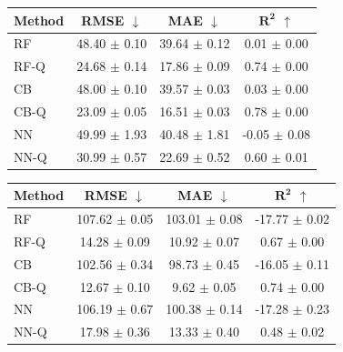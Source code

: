 \begin{table}[t]
    \vspace{1em}

    \begin{minipage}{0.48\textwidth}
        \centering
        \label{tab:ood-rtx5000}
        \begin{tabular}{lccc}
            \toprule
            \textbf{Method} & \textbf{RMSE} $\downarrow$ & \textbf{MAE} $\downarrow$ & $\boldsymbol{R^2}$ $\uparrow$ \\
            \midrule
            RF      & 48.40 $\pm$ 0.10 & 39.64 $\pm$ 0.12 & 0.01 $\pm$ 0.00 \\
            RF-Q    & 24.68 $\pm$ 0.14 & 17.86 $\pm$ 0.09 & 0.74 $\pm$ 0.00 \\
            \midrule
            CB      & 48.00 $\pm$ 0.10 & 39.57 $\pm$ 0.03 & 0.03 $\pm$ 0.00 \\
            CB-Q    & 23.09 $\pm$ 0.05 & 16.51 $\pm$ 0.03 & 0.78 $\pm$ 0.00 \\
            \midrule
            NN      & 49.99 $\pm$ 1.93 & 40.48 $\pm$ 1.81 & -0.05 $\pm$ 0.08 \\
            NN-Q    & 30.99 $\pm$ 0.57 & 22.69 $\pm$ 0.52 & 0.60 $\pm$ 0.01 \\
            \bottomrule
        \end{tabular}
    \end{minipage}
    \hfill
    \begin{minipage}{0.48\textwidth}
        \centering
        \label{tab:ood-rtx4000}
        \begin{tabular}{lccc}
            \toprule
            \textbf{Method} & \textbf{RMSE} $\downarrow$ & \textbf{MAE} $\downarrow$ & $\boldsymbol{R^2}$ $\uparrow$ \\
            \midrule
            RF      & 107.62 $\pm$ 0.05 & 103.01 $\pm$ 0.08 & -17.77 $\pm$ 0.02 \\
            RF-Q    & 14.28 $\pm$ 0.09 & 10.92 $\pm$ 0.07 & 0.67 $\pm$ 0.00 \\
            \midrule
            CB      & 102.56 $\pm$ 0.34 & 98.73 $\pm$ 0.45 & -16.05 $\pm$ 0.11 \\
            CB-Q    & 12.67 $\pm$ 0.10 & 9.62 $\pm$ 0.05 & 0.74 $\pm$ 0.00 \\
            \midrule
            NN      & 106.19 $\pm$ 0.67 & 100.38 $\pm$ 0.14 & -17.28 $\pm$ 0.23 \\
            NN-Q    & 17.98 $\pm$ 0.36 & 13.33 $\pm$ 0.40 & 0.48 $\pm$ 0.02 \\
            \bottomrule
        \end{tabular}
    \end{minipage}
\end{table}